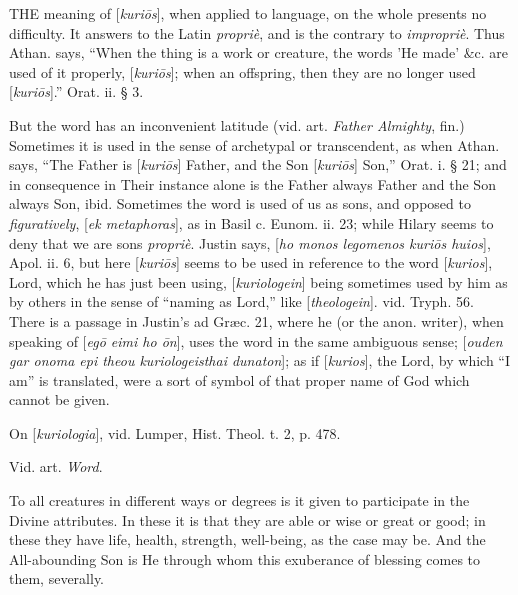 
THE
meaning of [\emph{kuri\={o}s}], when applied to language, on the
whole presents no difficulty. It answers to the Latin \emph{propriè},
and is the contrary to \emph{impropriè}. Thus Athan. says, ``When the
thing is a work or creature, the words 'He made' \&c. are used of
it properly, [\emph{kuri\={o}s}]; when an offspring, then they are
no longer used [\emph{kuri\={o}s}].'' Orat. ii. § 3.

But the word has an inconvenient latitude (vid.
art. \emph{Father Almighty}, fin.) Sometimes it is used in the sense
of archetypal or transcendent, as when Athan. says, ``The Father is [\emph{kuri\={o}s}]
Father, and the Son [\emph{kuri\={o}s}] Son,'' Orat. i. § 21; and
in consequence in Their instance alone is the Father always Father and
the Son always Son, ibid. Sometimes the word is used of us as sons,
and opposed to \emph{figuratively}, [\emph{ek metaphoras}], as in
Basil c. Eunom. ii. 23; while Hilary seems to deny that we are sons \emph{propriè}.
Justin says, [\emph{ho monos legomenos kuri\={o}s huios}], Apol.
ii. 6, but here [\emph{kuri\={o}s}] seems to be used in reference
to the word [\emph{kurios}], Lord, which he has just been using, [\emph{kuriologein}]
being sometimes used by him as by others in the sense of ``naming as
Lord,'' like [\emph{theologein}]. vid. Tryph. 56. There is a passage in
Justin's ad Græc. 21, where he (or the anon. writer), when speaking
of [\emph{eg\={o} eimi ho \={o}n}], uses the word in the same
ambiguous sense; [\emph{ouden gar onoma epi theou kuriologeisthai dunaton}];
as if [\emph{kurios}], the Lord, by which ``I am'' is translated,
were a sort of symbol of that proper name of God which cannot be
given.

On [\emph{kuriologia}], vid. Lumper, Hist. Theol.
t. 2, p. 478.


Vid. art. \emph{Word}.

\xsection{[Metousia]}

To all creatures in different ways or degrees is
it given to participate in the Divine attributes. In these it is that
they are able or wise or great or good; in these they have life,
health, strength, well-being, as the case may be. And the
All-abounding Son is He through whom this exuberance of blessing comes
to them, severally.

